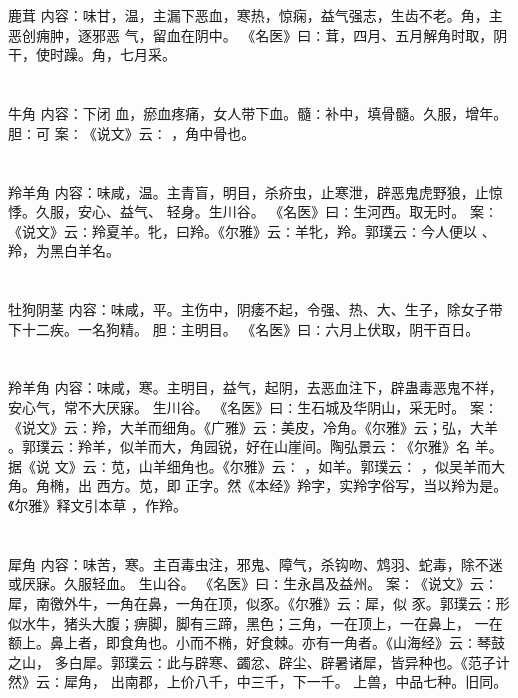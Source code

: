 \documentclass[12pt,UTF8]{ctexbook}
\begin{document}
\section{}鹿茸
内容：味甘，温，主漏下恶血，寒热，惊痫，益气强志，生齿不老。角，主恶创痈肿，逐邪恶 
气，留血在阴中。 
《名医》曰∶茸，四月、五月解角时取，阴干，使时躁。角，七月采。 


\section{}牛角
内容：下闭 
血，瘀血疼痛，女人带下血。髓∶补中，填骨髓。久服，增年。胆∶可 
案∶《说文》云∶ ，角中骨也。 


\section{}羚羊角
内容：味咸，温。主青盲，明目，杀疥虫，止寒泄，辟恶鬼虎野狼，止惊悸。久服，安心、益气、 
轻身。生川谷。 
《名医》曰∶生河西。取无时。 
案∶《说文》云∶羚夏羊。牝，曰羚。《尔雅》云∶羊牝，羚。郭璞云∶今人便以 、 
羚，为黑白羊名。 


\section{}牡狗阴茎
内容：味咸，平。主伤中，阴痿不起，令强、热、大、生子，除女子带下十二疾。一名狗精。 
胆∶主明目。 
《名医》曰∶六月上伏取，阴干百日。 


\section{}羚羊角
内容：味咸，寒。主明目，益气，起阴，去恶血注下，辟蛊毒恶鬼不祥，安心气，常不大厌寐。 
生川谷。 
《名医》曰∶生石城及华阴山，采无时。 
案∶《说文》云∶羚，大羊而细角。《广雅》云∶美皮，冷角。《尔雅》云；弘，大羊 
。郭璞云∶羚羊，似羊而大，角园锐，好在山崖间。陶弘景云∶《尔雅》名 羊。据《说 
文》云∶苋，山羊细角也。《尔雅》云∶ ，如羊。郭璞云∶ ，似吴羊而大角。角椭，出 
西方。苋，即 正字。然《本经》羚字，实羚字俗写，当以羚为是。《尔雅》释文引本草 
，作羚。 


\section{}犀角
内容：味苦，寒。主百毒虫注，邪鬼、障气，杀钩吻、鸩羽、蛇毒，除不迷或厌寐。久服轻血。 
生山谷。 
《名医》曰∶生永昌及益州。 
案∶《说文》云∶犀，南徼外牛，一角在鼻，一角在顶，似豕。《尔雅》云∶犀，似 
豕。郭璞云∶形似水牛，猪头大腹；痹脚，脚有三蹄，黑色；三角，一在顶上，一在鼻上， 
一在额上。鼻上者，即食角也。小而不椭，好食棘。亦有一角者。《山海经》云∶琴鼓之山， 
多白犀。郭璞云∶此与辟寒、蠲忿、辟尘、辟暑诸犀，皆异种也。《范子计然》云∶犀角， 
出南郡，上价八千，中三千，下一千。 
上兽，中品七种。旧同。 
\end{document}

